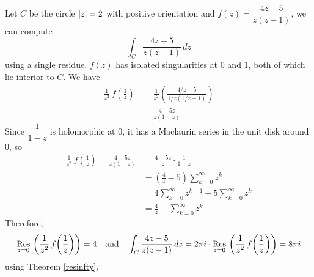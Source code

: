 \begin{example}
Let $C$ be the circle $\left\lvert z\right\rvert = 2$ with positive orientation and $f(z) = \dfrac{4z - 5}{z(z - 1)}$, we can compute
\[\int_C\frac{4z - 5}{z(z - 1)}\,dz\]
using a single residue. $f(z)$ has isolated singularities at $0$ and $1$, both of which lie interior to $C$. We have
\begin{align*}
\frac{1}{z^2}\,f\!\left(\frac{1}{z}\right) &= \frac{1}{z^2}\left(\frac{4/z - 5}{1/z(1/z - 1)}\right)\\[0.5em]
 &= \frac{4 - 5z}{z(1-z)}
\end{align*}
Since $\dfrac{1}{1 - z}$ is holomorphic at $0$, it has a Maclaurin series in the unit disk around $0$, so
\begin{align*}
\frac{1}{z^2}\,f\!\left(\frac{1}{z}\right) = \frac{4 - 5z}{z(1-z)} &= \frac{4 - 5z}{z}\cdot\frac{1}{1 - z}\\[0.5em]
 &= \left(\frac{4}{z} - 5\right)\sum_{k=0}^\infty z^k\\[0.5em]
 &= 4\sum_{k=0}^\infty z^{k-1} - 5\sum_{k=0}^\infty z^k\\[0.5em]
 &= \frac{4}{z} - \sum_{k=0}^\infty z^k
\end{align*}
Therefore,
\[\underset{z = {0}}{\operatorname{Res}}\,\left(\frac{1}{z^2}\,f\!\left(\frac{1}{z}\right)\right) = 4 \quad \text{and} \quad \int_C\frac{4z - 5}{z(z - 1)}\,dz = 2\pi i\cdot\underset{z = {0}}{\operatorname{Res}}\,\left(\frac{1}{z^2}\,f\!\left(\frac{1}{z}\right)\right) = 8\pi i\]
using Theorem \ref{resinfty}.
\end{example}

\vspace*{1em}

